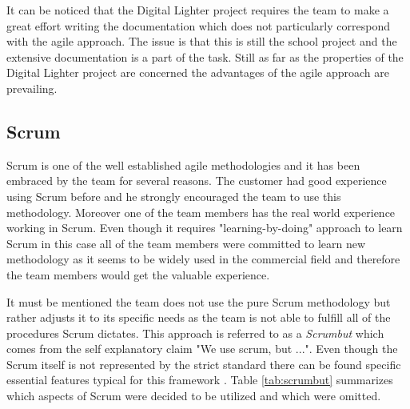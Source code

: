 It can be noticed that the Digital Lighter project requires the team to make a great effort writing the documentation which does not particularly correspond with the agile approach. The issue is that this is still the school project and the extensive documentation is a part of the task. Still as far as the properties of the Digital Lighter project are concerned the advantages of the agile approach are prevailing.

\subsection{Scrum} \label{subsec:scrum}
Scrum is one of the well established agile methodologies and it has been embraced by the team for several reasons. The customer had good experience using Scrum before and he strongly encouraged the team to use this methodology. Moreover one of the team members has the real world experience working in Scrum. Even though it requires "learning-by-doing" approach to learn Scrum in this case all of the  team members were committed to learn new methodology as it seems to be widely used in the commercial field and therefore the team members would get the valuable experience.

It must be mentioned the team does not use the pure Scrum methodology but rather adjusts it to its specific needs as the team is not able to fulfill all of the procedures Scrum dictates. This approach is referred to as a \textit{Scrumbut} \cite{viscardi2013professional} which comes from the self explanatory claim "We use scrum, but ...". Even though the Scrum itself is not represented by the strict standard there can be found specific essential features typical for this framework \cite{TheScrumGuide} \cite[p. 15, p. 97, p. 154]{viscardi2013professional}. Table \ref{tab:scrumbut} summarizes which aspects of Scrum were decided to be utilized and which were omitted. 

